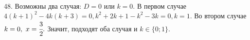 48. Возможны два случая: $D=0$ или $k=0.$ В первом случае $4(k+1)^2-4k(k+3)=0, k^2+2k+1-k^2-3k=0, k=1.$ Во втором случае $k=0,\ x=\cfrac{3}{2}.$ Значит, подходят оба случая и $k\in\{0;1\}.$\\
